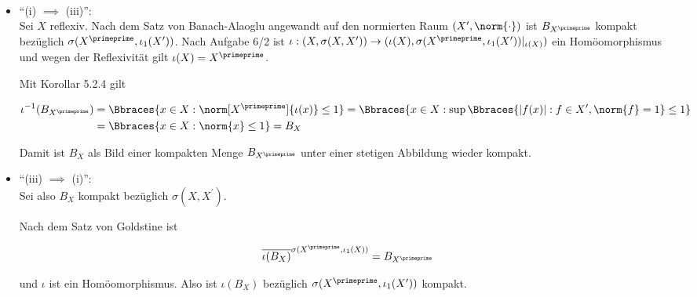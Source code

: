 \begin{solution}

\leavevmode \\


\begin{itemize}

  \item
  \enquote{(i) $\implies$ (iii)}: \\

  Sei $X$ reflexiv.
  Nach dem Satz von Banach-Alaoglu angewandt auf den normierten Raum $(X^\prime,\norm{\cdot})$ ist $B_{X^\primeprime}$ kompakt bezüglich $\sigma(X^\primeprime, \iota_1(X^\prime))$.
  Nach Aufgabe 6/2 ist $\iota: (X,\sigma(X,X^\prime)) \to (\iota(X), \sigma(X^\primeprime,\iota_1(X^\prime))|_{\iota(X)})$ ein Homöomorphismus und wegen der Reflexivität gilt $\iota(X) = X^\primeprime$.


  Mit Korollar 5.2.4 gilt

  \begin{align*}
    \iota^{-1}(B_{X^\primeprime})
    & =
    \Bbraces
    {
      x \in X:
      \norm[X^\primeprime]{\iota(x)} \leq 1
    }
    =
    \Bbraces
    {
      x \in X:
      \sup \Bbraces
      {
        |f(x)|:
        f \in X^\prime,
        \norm{f} = 1
      }
      \leq 1
    } \\
    & =
    \Bbraces
    {
      x \in X:
      \norm{x} \leq 1
    }
    = B_X
  \end{align*}

  Damit ist $B_X$ als Bild einer kompakten Menge $B_{X^\primeprime}$ unter einer stetigen Abbildung wieder kompakt.

  \item
  \enquote{(iii) $\implies$ (i)}: \\

  Sei also $B_X$ kompakt bezüglich $\sigma(X, X^\prime)$.


  Nach dem Satz von Goldstine ist

  \begin{align*}
    \overline
    {
      \iota(B_X)}^{\sigma(X^\primeprime, \iota_1(X))
    }
    =
    B_{X^\primeprime}
  \end{align*}

  und $\iota$ ist ein Homöomorphismus.
  Also ist $\iota(B_X)$ bezüglich $\sigma(X^\primeprime, \iota_1(X^\prime))$ kompakt.


\end{itemize}
\end{solution}
